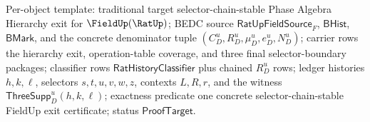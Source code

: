 Per-object template: traditional target selector-chain-stable Phase Algebra
Hierarchy exit for $\FieldUp(\RatUp)$; BEDC source
$\mathsf{RatUpFieldSource}_F$, $\mathsf{BHist}$, $\mathsf{BMark}$, and the
concrete denominator tuple $(C_D^u,R_D^u,\mu_D^u,e_D^u,N_D^u)$; carrier rows
the hierarchy exit, operation-table coverage, and three final
selector-boundary packages; classifier rows $\mathsf{RatHistoryClassifier}$
plus chained $R_D^u$ rows; ledger histories $h,k,\ell$, selectors
$s,t,u,v,w,z$, contexts $L,R,r$, and the witness
$\mathsf{ThreeSupp}_D^u(h,k,\ell)$; exactness predicate one concrete
selector-chain-stable FieldUp exit certificate; status $\mathsf{ProofTarget}$.
